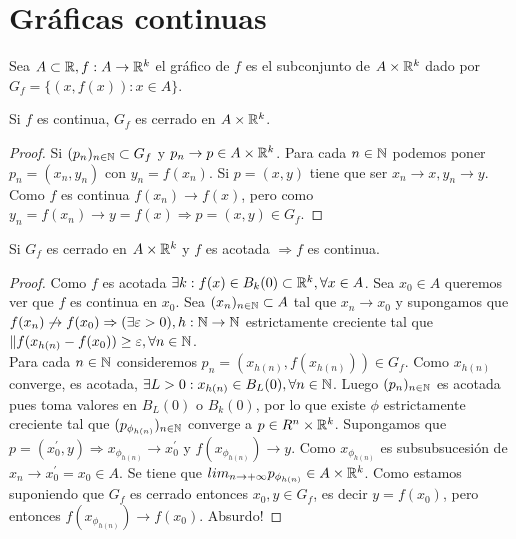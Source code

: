 \section{Gráficas continuas}

\begin{definition}
  Sea $A \subset \mathbb{R}, f: A \to \mathbb{R}^k$ el gráfico de $f$ es el subconjunto de $A \times \mathbb{R}^k$ dado por $G_f = \{ (x, f(x)) : x \in A \}$.
\end{definition}

\begin{prop}
  Si $f$ es continua, $G_f$ es cerrado en $A \times \mathbb{R}^k$. 
  \begin{proof}
    Si $(p_n)_{n \in \mathbb{N}} \subset G_f$ y $p_n \to p \in A \times \mathbb{R}^k$. Para cada $n \in \mathbb{N}$ podemos poner $p_n = (x_n, y_n)$ con $y_n = f(x_n)$. Si $p = (x, y)$ tiene que ser $x_n \to x, y_n \to y$. Como $f$ es continua $f(x_n) \to f(x)$, pero como $y_n = f(x_n) \to y = f(x) \Rightarrow p = (x, y) \in G_f$. 
  \end{proof}
\end{prop}

\begin{prop}
  Si $G_f$ es cerrado en $A \times \mathbb{R}^k$ y $f$ es acotada $\Rightarrow f$ es continua.
  \begin{proof}
    Como $f$ es acotada $\exists k : f(x) \in B_k(0) \subset \mathbb{R}^k, \forall x \in A$. Sea $x_0 \in A$ queremos ver que $f$ es continua en $x_0$. Sea $(x_n)_{n \in \mathbb{N}} \subset A$ tal que $x_n \to x_0$ y supongamos que $f(x_n) \not \to f(x_0) \Rightarrow (\exists \varepsilon > 0), h: \mathbb{N} \to \mathbb{N}$ estrictamente creciente tal que $\|f(x_{h(n)} - f(x_0)) \geq \varepsilon, \forall n \in \mathbb{N}$. \\
    Para cada $n \in \mathbb{N}$ consideremos $p_n = (x_{h(n)}, f(x_{h(n)})) \in G_f$. Como $x_{h(n)}$ converge, es acotada, $\exists L > 0 : x_{h(n)} \in B_L(0), \forall n \in \mathbb{N}$. Luego $(p_n)_{n \in \mathbb{N}}$ es acotada pues toma valores en $B_L(0)$ o $B_k(0)$, por lo que existe $\phi$ estrictamente creciente tal que $(p_{\phi_{h(n)}})_{n \in \mathbb{N}}$ converge a $p \in R^n \times \mathbb{R}^k$.
    Supongamos que $p = (x_0^{\prime}, y) \Rightarrow x_{\phi_{h(n)}} \to x_0^{\prime}$ y $f(x_{\phi_{h(n)}}) \to y$. Como $x_{\phi_{h(n)}}$ es subsubsucesión de $x_n \to x_0^{\prime} = x_0 \in A$. Se tiene que $lim_{n \to +\infty} p_{\phi_{h(n)}} \in A \times \mathbb{R}^k$. Como estamos suponiendo que $G_f$ es cerrado entonces $x_0, y \in G_f$, es decir $y = f(x_0)$, pero entonces $f(x_{\phi_{h(n)}}) \to f(x_0)$. Absurdo!
  \end{proof}
\end{prop}

